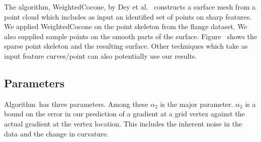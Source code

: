 The algorithm, WeightedCocone, by Dey et al.~\cite{dgqsww-fprss-12} constructs a surface mesh
from a point cloud which includes as input an identified set of points on sharp features.
We applied WeightedCocone on the point skeleton from the flange dataset.
We also supplied sample points on the smooth parts of the surface.
Figure~ shows the sparse point skeleton and the resulting surface.
Other techniques which take as input feature curves/point can also
potentially use our results.

\subsection{Parameters}
Algorithm~\ReliGrad  has three parameters.
Among these $\alpha_{2}$ is the major parameter. 
$\alpha_{2}$ is a bound on the error in our prediction of a gradient 
at a grid vertex against the actual gradient at the vertex location. 
This includes the inherent noise in the data and the change in curvature.
\tiny
